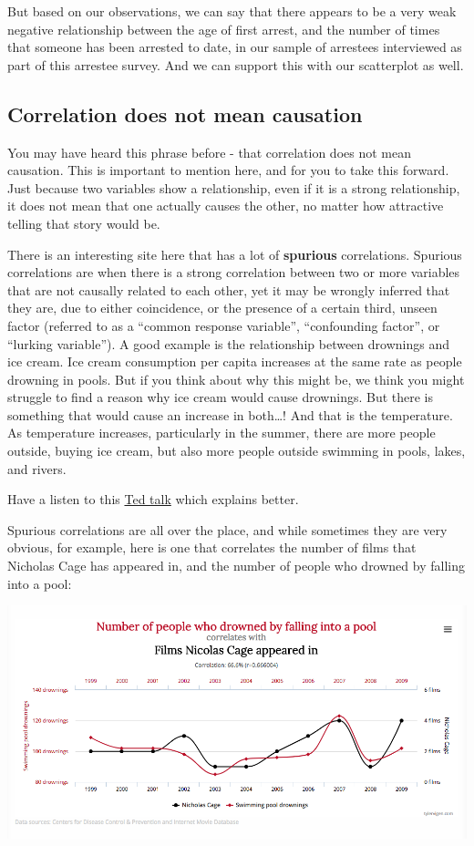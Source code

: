 \documentclass[
]{book}
\begin{document}
But based on our observations, we can say that there appears to be a very weak negative relationship between the age of first arrest, and the number of times that someone has been arrested to date, in our sample of arrestees interviewed as part of this arrestee survey. And we can support this with our scatterplot as well.

\hypertarget{correlation-does-not-mean-causation}{%
\subsection{Correlation does not mean causation}\label{correlation-does-not-mean-causation}}

You may have heard this phrase before - that correlation does not mean causation. This is important to mention here, and for you to take this forward. Just because two variables show a relationship, even if it is a strong relationship, it does not mean that one actually causes the other, no matter how attractive telling that story would be.

There is an interesting site here that has a lot of \textbf{spurious} correlations. Spurious correlations are when there is a strong correlation between two or more variables that are not causally related to each other, yet it may be wrongly inferred that they are, due to either coincidence, or the presence of a certain third, unseen factor (referred to as a ``common response variable'', ``confounding factor'', or ``lurking variable''). A good example is the relationship between drownings and ice cream. Ice cream consumption per capita increases at the same rate as people drowning in pools. But if you think about why this might be, we think you might struggle to find a reason why ice cream would cause drownings. But there is something that would cause an increase in both\ldots! And that is the temperature. As temperature increases, particularly in the summer, there are more people outside, buying ice cream, but also more people outside swimming in pools, lakes, and rivers.

Have a listen to this \href{https://www.youtube.com/watch?v=8B271L3NtAw}{Ted talk} which explains better.

Spurious correlations are all over the place, and while sometimes they are very obvious, for example, here is one that correlates the number of films that Nicholas Cage has appeared in, and the number of people who drowned by falling into a pool:

\includegraphics{imgs/supr_corr.png}
\end{document}
